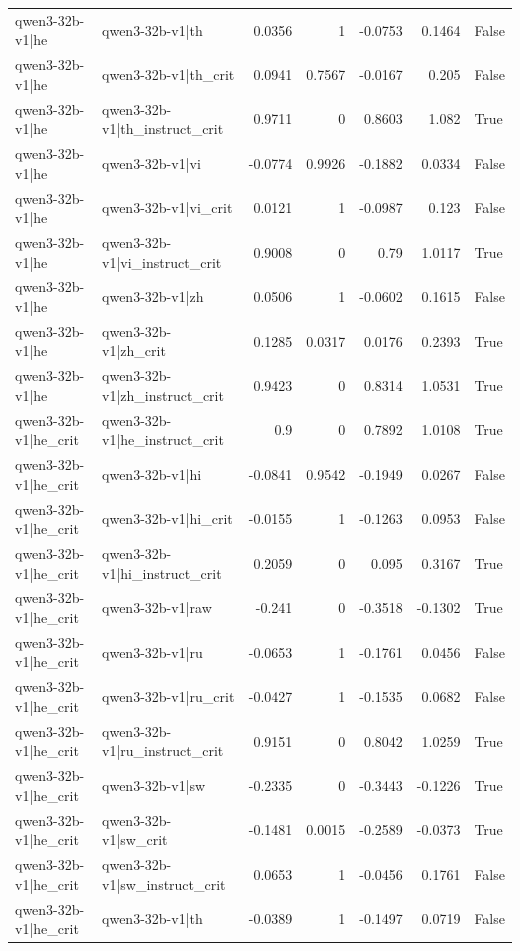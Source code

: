 \begin{table}
\begin{tabular}{l l r r r r l}
qwen3-32b-v1|he & qwen3-32b-v1|th & 0.0356 & 1 & -0.0753 & 0.1464 & False \\
qwen3-32b-v1|he & qwen3-32b-v1|th_crit & 0.0941 & 0.7567 & -0.0167 & 0.205 & False \\
qwen3-32b-v1|he & qwen3-32b-v1|th_instruct_crit & 0.9711 & 0 & 0.8603 & 1.082 & True \\
qwen3-32b-v1|he & qwen3-32b-v1|vi & -0.0774 & 0.9926 & -0.1882 & 0.0334 & False \\
qwen3-32b-v1|he & qwen3-32b-v1|vi_crit & 0.0121 & 1 & -0.0987 & 0.123 & False \\
qwen3-32b-v1|he & qwen3-32b-v1|vi_instruct_crit & 0.9008 & 0 & 0.79 & 1.0117 & True \\
qwen3-32b-v1|he & qwen3-32b-v1|zh & 0.0506 & 1 & -0.0602 & 0.1615 & False \\
qwen3-32b-v1|he & qwen3-32b-v1|zh_crit & 0.1285 & 0.0317 & 0.0176 & 0.2393 & True \\
qwen3-32b-v1|he & qwen3-32b-v1|zh_instruct_crit & 0.9423 & 0 & 0.8314 & 1.0531 & True \\
qwen3-32b-v1|he_crit & qwen3-32b-v1|he_instruct_crit & 0.9 & 0 & 0.7892 & 1.0108 & True \\
qwen3-32b-v1|he_crit & qwen3-32b-v1|hi & -0.0841 & 0.9542 & -0.1949 & 0.0267 & False \\
qwen3-32b-v1|he_crit & qwen3-32b-v1|hi_crit & -0.0155 & 1 & -0.1263 & 0.0953 & False \\
qwen3-32b-v1|he_crit & qwen3-32b-v1|hi_instruct_crit & 0.2059 & 0 & 0.095 & 0.3167 & True \\
qwen3-32b-v1|he_crit & qwen3-32b-v1|raw & -0.241 & 0 & -0.3518 & -0.1302 & True \\
qwen3-32b-v1|he_crit & qwen3-32b-v1|ru & -0.0653 & 1 & -0.1761 & 0.0456 & False \\
qwen3-32b-v1|he_crit & qwen3-32b-v1|ru_crit & -0.0427 & 1 & -0.1535 & 0.0682 & False \\
qwen3-32b-v1|he_crit & qwen3-32b-v1|ru_instruct_crit & 0.9151 & 0 & 0.8042 & 1.0259 & True \\
qwen3-32b-v1|he_crit & qwen3-32b-v1|sw & -0.2335 & 0 & -0.3443 & -0.1226 & True \\
qwen3-32b-v1|he_crit & qwen3-32b-v1|sw_crit & -0.1481 & 0.0015 & -0.2589 & -0.0373 & True \\
qwen3-32b-v1|he_crit & qwen3-32b-v1|sw_instruct_crit & 0.0653 & 1 & -0.0456 & 0.1761 & False \\
qwen3-32b-v1|he_crit & qwen3-32b-v1|th & -0.0389 & 1 & -0.1497 & 0.0719 & False \\

\end{tabular}
\end{table}
